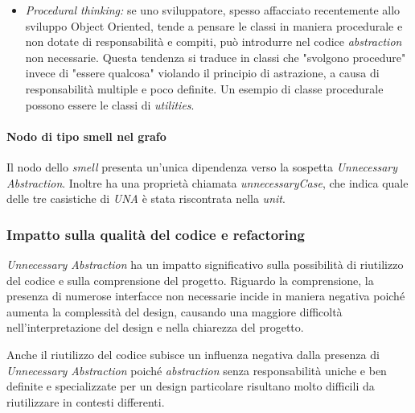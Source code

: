 \begin{itemize}
        
        \item \textit{Procedural thinking:} %
        se uno sviluppatore, spesso affacciato recentemente allo sviluppo Object Oriented, tende a pensare le classi in maniera procedurale e non dotate di responsabilità e compiti, può introdurre nel codice \textit{abstraction} non necessarie. 
        Questa tendenza si traduce in classi che "svolgono procedure" invece di "essere qualcosa" violando il principio di astrazione, a causa di responsabilità multiple e poco definite. Un esempio di classe procedurale possono essere le classi di \textit{utilities}.
    \end{itemize}
    
    
    \paragraph{Nodo di tipo smell nel grafo}
        Il nodo dello \textit{smell} presenta un'unica dipendenza verso la sospetta \textit{Unnecessary Abstraction}. Inoltre ha una proprietà chiamata \textit{unnecessaryCase}, che indica quale delle tre casistiche di \textit{UNA} è stata riscontrata nella \textit{unit}.
        
            
    \subsubsection{Impatto sulla qualità del codice e refactoring}
        \textit{Unnecessary Abstraction} ha un impatto significativo sulla possibilità di riutilizzo del codice e sulla comprensione del progetto. 
        Riguardo la comprensione, la presenza di numerose interfacce non necessarie incide in maniera negativa poiché aumenta la complessità del design, causando una maggiore difficoltà nell'interpretazione del design e nella chiarezza del progetto.
        
        Anche il riutilizzo del codice subisce un influenza negativa dalla presenza di \textit{Unnecessary Abstraction} poiché \textit{abstraction} senza responsabilità uniche e ben definite e specializzate per un design particolare risultano molto difficili da riutilizzare in contesti differenti.
        
